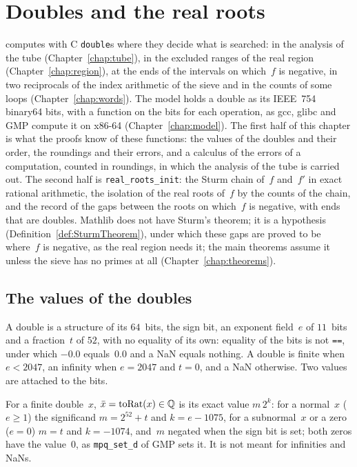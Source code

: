\chapter{Doubles and the real roots}\label{chap:doubles}

\jpoints{} computes with C \texttt{double}s where they decide what is searched: in the analysis of
the tube (Chapter~\ref{chap:tube}), in the excluded ranges of the real region
(Chapter~\ref{chap:region}), at the ends of the intervals on which~$f$ is negative, in two
reciprocals of the index arithmetic of the sieve and in the counts of some loops
(Chapter~\ref{chap:words}). The model holds a double as its IEEE~754 binary64 bits, with a function
on the bits for each operation, as gcc, glibc and GMP compute it on x86-64
(Chapter~\ref{chap:model}). The first half of this chapter is what the proofs know of these
functions: the values of the doubles and their order, the roundings and their errors, and a
calculus of the errors of a computation, counted in roundings, in which the analysis of the tube is
carried out. The second half is \texttt{real\_roots\_init}: the Sturm chain of~$f$
and~$f'$ in exact rational arithmetic, the isolation of the real roots of~$f$ by the counts of the
chain, and the record of the gaps between the roots on which~$f$ is negative, with ends that are
doubles. Mathlib does not have Sturm's theorem; it is a hypothesis
(Definition~\ref{def:SturmTheorem}), under which these gaps are proved to be where~$f$ is negative,
as the real region needs it; the main theorems assume it unless the sieve has no primes at all (Chapter~\ref{chap:theorems}).

\section{The values of the doubles}\label{sec:doubleValues}

A double is a structure of its $64$~bits, the sign bit, an exponent field~$e$ of $11$~bits and a
fraction~$t$ of $52$, with no equality of its own: equality of the bits is not \texttt{==}, under
which $-0.0$ equals~$0.0$ and a NaN equals nothing. A double is finite when $e < 2047$, an infinity
when $e = 2047$ and $t = 0$, and a NaN otherwise. Two values are attached to the bits.

\begin{definition}\label{def:Double.toRat}
  \leanok
  For a finite double~$x$, $\bar x = \mathrm{toRat}(x) \in \mathbb{Q}$ is its exact value $m\,2^k$: for a
  normal~$x$ ($e \ge 1$) the significand $m = 2^{52} + t$ and $k = e - 1075$, for a subnormal~$x$
  or a zero ($e = 0$) $m = t$ and $k = -1074$, and~$m$ negated when the sign bit is set; both zeros
  have the value~$0$, as \texttt{mpq\_set\_d} of GMP sets it. It is not meant for infinities and
  NaNs.
\end{definition}

